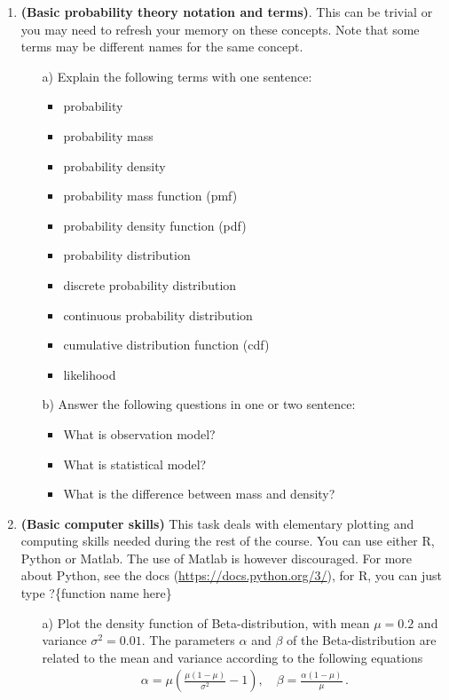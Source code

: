 \documentclass[11pt,a4paper,english]{article}
\begin{document}
\begin{enumerate}

\item {\bf (Basic probability theory notation and terms)}. This can be trivial or you may need to refresh your memory on these concepts. Note that some terms may be different names for the same concept.
  \begin{itemize}
  \item[a)] Explain the following terms with one sentence:
    \begin{itemize}
    \item probability
    \item probability mass
    \item probability density
    \item probability mass function (pmf)
    \item probability density function (pdf)
    \item probability distribution
    \item discrete probability distribution
    \item continuous probability distribution
    \item cumulative distribution function (cdf)
    \item likelihood
    \end{itemize}
  \item[b)] Answer the following questions in one or two sentence:
    \begin{itemize}
    \item What is observation model?
    \item What is statistical model?
    \item What is the difference between mass and density?
    \end{itemize}
  \end{itemize}

\item {\bf (Basic computer skills)} This task deals with elementary plotting and computing skills needed during the rest of the course. You can use either R, Python or Matlab. The use of Matlab is however discouraged.
For more about Python, see the docs (\href{https://docs.python.org/3/}{https://docs.python.org/3/}), for R, you can just type ?\{function name here\}
\begin{itemize}
	\item[a)] Plot the density function of Beta-distribution, with mean $\mu = 0.2$ and variance $\sigma^2=0.01$. The parameters $\alpha$ and $\beta$ of the Beta-distribution are related to the mean and variance according to the following equations
	\begin{align*}
	\alpha = \mu \left( \frac{\mu(1-\mu)}{\sigma^2} - 1 \right), \quad
	\beta = \frac{\alpha (1-\mu) }{\mu} \,.
\end{align*}


\end{itemize}
\end{enumerate}
\end{document}
